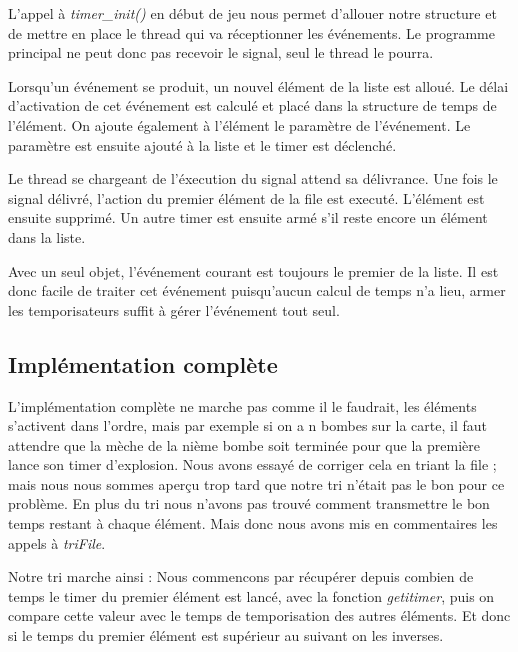 \documentclass[10pt,a4paper]{article}
\begin{document}
	L'appel à \textit{timer\_init()} en début de jeu nous permet d'allouer notre structure et de mettre en place le thread qui va réceptionner les événements. Le programme principal ne peut donc pas recevoir le signal, seul le thread le pourra. 
	
	Lorsqu'un événement se produit, un nouvel élément de la liste est alloué. Le délai d'activation de cet événement est calculé et placé dans la structure de temps de l'élément. On ajoute également à l'élément le paramètre de l'événement. Le paramètre est ensuite ajouté à la liste et le timer est déclenché.
	
	Le thread se chargeant de l'éxecution du signal attend sa délivrance. Une fois le signal délivré, l'action du premier élément de la file est executé. L'élément est ensuite supprimé.  Un autre timer est ensuite armé s’il reste encore un élément dans la liste.
	
	Avec un seul objet, l'événement courant est toujours le premier de la liste. Il est donc facile de traiter cet événement puisqu'aucun calcul de temps n'a lieu, armer les temporisateurs suffit à gérer l'événement tout seul.
	
	\subsection{Implémentation complète} 
    L'implémentation complète ne marche pas comme il le faudrait, les éléments s'activent dans l'ordre, mais par exemple si on a n bombes sur la carte, il faut attendre que la mèche de la nième bombe soit terminée pour que la première lance son timer d'explosion. Nous avons essayé de corriger cela en triant la file ; mais nous nous sommes aperçu trop tard que notre tri n'était pas le bon pour ce problème. En plus du tri nous n'avons pas trouvé comment transmettre le bon temps restant à chaque élément. Mais donc nous avons mis en commentaires les appels à \textit{triFile}.
    
    Notre tri marche ainsi :
    Nous commencons par récupérer depuis combien de temps le timer du premier élément est lancé, avec la fonction \textit{getitimer}, puis on compare cette valeur avec le temps de temporisation des autres éléments. Et donc si le temps du premier élément est supérieur au suivant on les inverses. 
\end{document}
